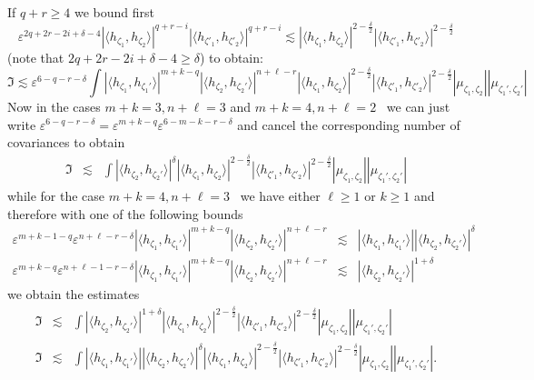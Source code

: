 \documentclass[a4paper,11pt]{article}
\begin{document}
If $q + r \geqslant 4$ we bound first
\[ \varepsilon^{2 q + 2 r - 2 i + \delta - 4} | \langle h_{\zeta_1},
   h_{\zeta_2} \rangle |^{q + r - i} | \langle h_{\zeta'_1}, h_{\zeta'_2}
   \rangle |^{q + r - i} \lesssim | \langle h_{\zeta_1}, h_{\zeta_2} \rangle
   |^{2 - \frac{\delta}{2}} | \langle h_{\zeta'_1}, h_{\zeta'_2} \rangle |^{2
   - \frac{\delta}{2}} \]
(note that $2 q + 2 r - 2 i + \delta - 4 \geqslant \delta$) to obtain:
\[ \mathfrak{I} \lesssim \varepsilon^{6 - q - r - \delta} \int | \langle
   h_{\zeta_1}, h_{\zeta_1'} \rangle |^{m + k - q} | \langle h_{\zeta_2},
   h_{\zeta_2'} \rangle |^{n + \ell - r} | \langle h_{\zeta_1}, h_{\zeta_2}
   \rangle |^{2 - \frac{\delta}{2}} | \langle h_{\zeta'_1}, h_{\zeta'_2}
   \rangle |^{2 - \frac{\delta}{2}} | \mu_{\zeta_1, \zeta_2} | |
   \mu_{\zeta_1', \zeta_2'} | \]
Now in the cases $m + k = 3, n + \ell = 3$ and $m + k = 4, n + \ell = 2$ \ we
can just write $\varepsilon^{6 - q - r - \delta} = \varepsilon^{m + k - q}
\varepsilon^{6 - m - k - r - \delta}$ and cancel the corresponding number of
covariances to obtain
\begin{eqnarray}
  \mathfrak{I} & \lesssim & \int | \langle h_{\zeta_2}, h_{\zeta_2'} \rangle
  |^{\delta} | \langle h_{\zeta_1}, h_{\zeta_2} \rangle |^{2 -
  \frac{\delta}{2}} | \langle h_{\zeta'_1}, h_{\zeta'_2} \rangle |^{2 -
  \frac{\delta}{2}} | \mu_{\zeta_1, \zeta_2} | | \mu_{\zeta_1', \zeta_2'} | 
  \label{e:graph-est-5}
\end{eqnarray}
while for the case $m + k = 4, n + \ell = 3$ \ we have either $\ell \geqslant
1$ or $k \geqslant 1$ and therefore with one of the following bounds
\begin{eqnarray*}
  \varepsilon^{m + k - 1 - q} \varepsilon^{n + \ell - r - \delta} | \langle
  h_{\zeta_1}, h_{\zeta_1'} \rangle |^{m + k - q} | \langle h_{\zeta_2},
  h_{\zeta_2'} \rangle |^{n + \ell - r} & \lesssim & | \langle h_{\zeta_1},
  h_{\zeta_1'} \rangle | | \langle h_{\zeta_2}, h_{\zeta_2'} \rangle
  |^{\delta}\\
  \varepsilon^{m + k - q} \varepsilon^{n + \ell - 1 - r - \delta} | \langle
  h_{\zeta_1}, h_{\zeta_1'} \rangle |^{m + k - q} | \langle h_{\zeta_2},
  h_{\zeta_2'} \rangle |^{n + \ell - r} & \lesssim & | \langle h_{\zeta_2},
  h_{\zeta_2'} \rangle |^{1 + \delta}
\end{eqnarray*}
we obtain the estimates
\begin{eqnarray}
  \mathfrak{I} & \lesssim & \int | \langle h_{\zeta_2}, h_{\zeta_2'} \rangle
  |^{1 + \delta} | \langle h_{\zeta_1}, h_{\zeta_2} \rangle |^{2 -
  \frac{\delta}{2}} | \langle h_{\zeta'_1}, h_{\zeta'_2} \rangle |^{2 -
  \frac{\delta}{2}} | \mu_{\zeta_1, \zeta_2} | | \mu_{\zeta_1', \zeta_2'} | 
  \label{e:graph-est-6}\\
  \mathfrak{I} & \lesssim & \int | \langle h_{\zeta_1}, h_{\zeta_1'} \rangle |
  | \langle h_{\zeta_2}, h_{\zeta_2'} \rangle |^{\delta} | \langle
  h_{\zeta_1}, h_{\zeta_2} \rangle |^{2 - \frac{\delta}{2}} | \langle
  h_{\zeta'_1}, h_{\zeta'_2} \rangle |^{2 - \frac{\delta}{2}} | \mu_{\zeta_1,
  \zeta_2} | | \mu_{\zeta_1', \zeta_2'} | .  \label{e:graph-est-7}
\end{eqnarray}
\end{document}
